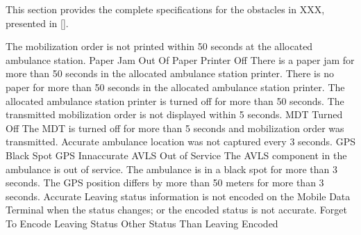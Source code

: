 \stopsubsection

\startsubsection[title={Obstacle specifications}]

This section provides the complete specifications for the obstacles
in XXX, presented in [].

\startkaosspec
	 {The mobilization order is not printed within 50 seconds at the allocated ambulance station.}
	 {Paper Jam}
	 {Out Of Paper}
	 {Printer Off}
\stopkaosspec
\startkaosspec
	 {There is a paper jam for more than 50 seconds in the allocated ambulance station printer.}
\stopkaosspec
\startkaosspec
	 {There is no paper for more than 50 seconds in the allocated ambulance station printer.}
\stopkaosspec
\startkaosspec
	 {The allocated ambulance station printer is turned off for more than 50 seconds.}
\stopkaosspec
\startkaosspec
	 {The transmitted mobilization order is not displayed within 5 seconds.}
	 {MDT Turned Off}
\stopkaosspec
\startkaosspec
	 {The MDT is turned off for more than 5 seconds and mobilization order was transmitted.}
\stopkaosspec
\startkaosspec
	 {Accurate ambulance location was not captured every 3 seconds.}
	 {GPS Black Spot}
	 {GPS Innaccurate}
	 {AVLS Out of Service}
\stopkaosspec
\startkaosspec
	 {The AVLS component in the ambulance is out of service.}
\stopkaosspec
\startkaosspec
	 {The ambulance is in a black spot for more than 3 seconds.}
\stopkaosspec
\startkaosspec
	 {The GPS position differs by more than 50 meters for more than 3 seconds.}
\stopkaosspec
\startkaosspec
	 {Accurate Leaving status information is not encoded on the Mobile Data Terminal when the status changes; or the encoded status is not accurate.}
	 {Forget To Encode Leaving Status}
	 {Other Status Than Leaving Encoded}
